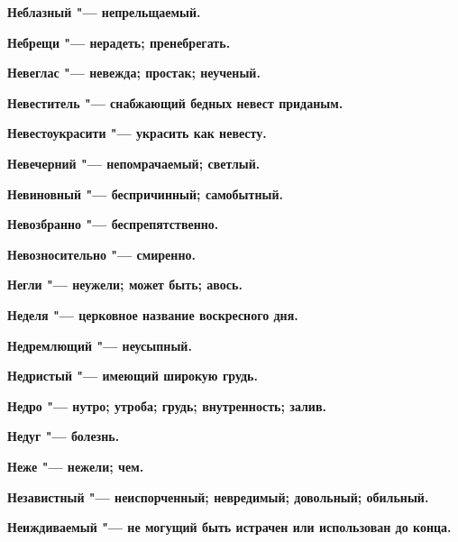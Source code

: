 \begin{mymulticols}{2}
\bfseries Неблазный\normalfont{} "--- непрельщаемый. 




\bfseries Небрещи\normalfont{} "--- нерадеть; пренебрегать. 




\bfseries Невеглас\normalfont{} "--- невежда; простак; неученый. 




\bfseries Невеститель\normalfont{} "--- снабжающий бедных невест приданым. 




\bfseries Невестоукрасити\normalfont{} "--- украсить как невесту. 




\bfseries Невечерний\normalfont{} "--- непомрачаемый; светлый. 




\bfseries Невиновный\normalfont{} "--- беспричинный; самобытный. 




\bfseries Невозбранно\normalfont{} "--- беспрепятственно. 




\bfseries Невозносительно\normalfont{} "--- смиренно. 




\bfseries Негли\normalfont{} "--- неужели; может быть; авось. 




\bfseries Неделя\normalfont{} "--- церковное название воскресного дня. 




\bfseries Недремлющий\normalfont{} "--- неусыпный. 




\bfseries Недристый\normalfont{} "--- имеющий широкую грудь. 




\bfseries Недро\normalfont{} "--- нутро; утроба; грудь; внутренность; залив. 




\bfseries Недуг\normalfont{} "--- болезнь. 




\bfseries Неже\normalfont{} "--- нежели; чем. 




\bfseries Независтный\normalfont{} "--- неиспорченный; невредимый; довольный; обильный. 




\bfseries Неиждиваемый\normalfont{} "--- не могущий быть истрачен или использован до конца. 





\end{mymulticols}

